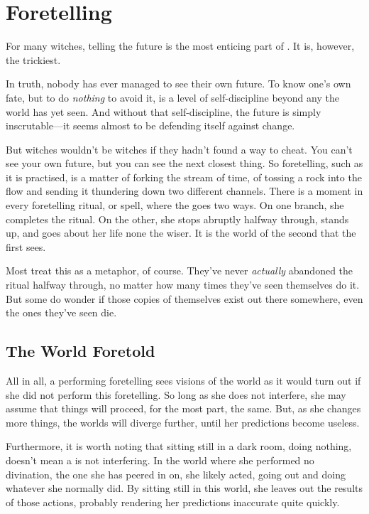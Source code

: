 \section{Foretelling}

For many witches, telling the future is the most enticing part of .
It is, however, the trickiest.

In truth, nobody has ever managed to see their own future.
To know one's own fate, but to do \emph{nothing} to avoid it, is a level of self-discipline beyond any  the world has yet seen.
And without that self-discipline, the future is simply inscrutable---it seems almost to be defending itself against change.

But witches wouldn't be witches if they hadn't found a way to cheat.
You can't see your own future, but you can see the next closest thing.
So foretelling, such as it is practised, is a matter of forking the stream of time, of tossing a rock into the flow and sending it thundering down two different channels.
There is a moment in every foretelling ritual, or spell, where the  goes two ways.
On one branch, she completes the ritual.
On the other, she stops abruptly halfway through, stands up, and goes about her life none the wiser.
It is the world of the second  that the first  sees.

Most  treat this as a metaphor, of course.
They've never \emph{actually} abandoned the ritual halfway through, no matter how many times they've seen themselves do it.
But some do wonder if those copies of themselves exist out there somewhere, even the ones they've seen die.

\subsection{The World Foretold}

All in all, a  performing foretelling sees visions of the world as it would turn out if she did not perform this foretelling.
So long as she does not interfere, she may assume that things will proceed, for the most part, the same.
But, as she changes more things, the worlds will diverge further, until her predictions become useless.

Furthermore, it is worth noting that sitting still in a dark room, doing nothing, doesn't mean a  is not interfering.
In the world where she performed no divination, the one she has peered in on, she likely acted, going out and doing whatever she normally did.
By sitting still in this world, she leaves out the results of those actions, probably rendering her predictions inaccurate quite quickly.

